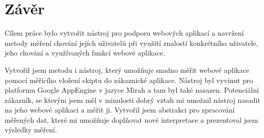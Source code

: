 \documentclass[bc,male,java,dept456]{diploma}						%
\begin{document}
\section{Závěr}
\label{sec:Conclusion}

Cílem práce bylo vytvořit nástroj pro podporu webových aplikací a navržení metody měření chování jejích uživatelů při využití znalosti konkrétního uživatele, jeho chování a využívaných funkcí webové aplikace.


Vytvořil jsem metodu i nástroj, který umožňuje snadno měřit webové aplikace pomocí měřícího vložení skiptu do zákaznické aplikace. Nástroj byl vyvinut pro platformu Google AppEngine v jazyce Mirah a tam byl také nasazen.  Potenciální zákazník, se kterým jsem měl v minulosti dobrý vztah mi umožnil nástroj nasadit na jeho webové aplikaci a měřit ji. Vytvořil jsem abstrakci pro zpracování měřených dat, které mi umožňuje do\-pl\-ňo\-vat nové interpretace a prezentoval jsem výsledky měření.

\end{document}
